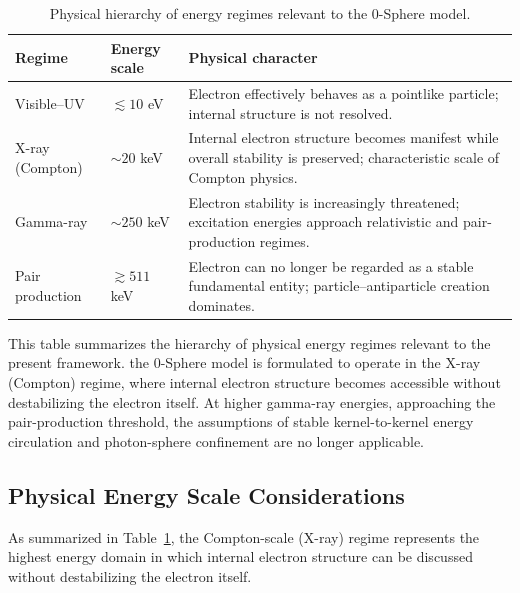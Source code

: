 \documentclass[%
 reprint,
 amsmath,amssymb,
 aps,
 prb,
]{revtex4-2}
\numberwithin{equation}{section}
\begin{document}
\begin{table}[t!]
\centering
\caption{Physical hierarchy of energy regimes relevant to the 0-Sphere model.}
\label{tab:energy_hierarchy}
\renewcommand{\arraystretch}{1.4}
\begin{tabular}{p{4.5cm}p{4.0cm}p{7.5cm}}
\toprule
\textbf{Regime} & \textbf{Energy scale} & \textbf{Physical character} \\
\midrule
Visible--UV
& $\lesssim 10$ eV
& Electron effectively behaves as a pointlike particle; internal structure is not resolved. \\
\addlinespace[0.25cm]

X-ray (Compton)
& $\sim 20$ keV
& Internal electron structure becomes manifest while overall stability is preserved; characteristic scale of Compton physics. \\
\addlinespace[0.25cm]

Gamma-ray
& $\sim 250$ keV
& Electron stability is increasingly threatened; excitation energies approach relativistic and pair-production regimes. \\
\addlinespace[0.25cm]

Pair production
& $\gtrsim 511$ keV
& Electron can no longer be regarded as a stable fundamental entity; particle--antiparticle creation dominates. \\
\bottomrule
\end{tabular}

\vspace{0.4em}
\begin{minipage}{0.95\textwidth}
\justifying\small
This table summarizes the hierarchy of physical energy regimes relevant to the present framework.
the 0-Sphere model is formulated to operate in the X-ray (Compton) regime, where internal electron structure becomes accessible without destabilizing the electron itself.
At higher gamma-ray energies, approaching the pair-production threshold, the assumptions of stable kernel-to-kernel energy circulation and photon-sphere confinement are no longer applicable.
\end{minipage}
\label{tab:energy_scale_hierarchy}
\end{table}


\subsection{Physical Energy Scale Considerations}

As summarized in Table~\ref{tab:energy_scale_hierarchy}, 
the Compton-scale (X-ray) regime represents the highest energy domain 
in which internal electron structure can be discussed 
without destabilizing the electron itself.
\end{document}
